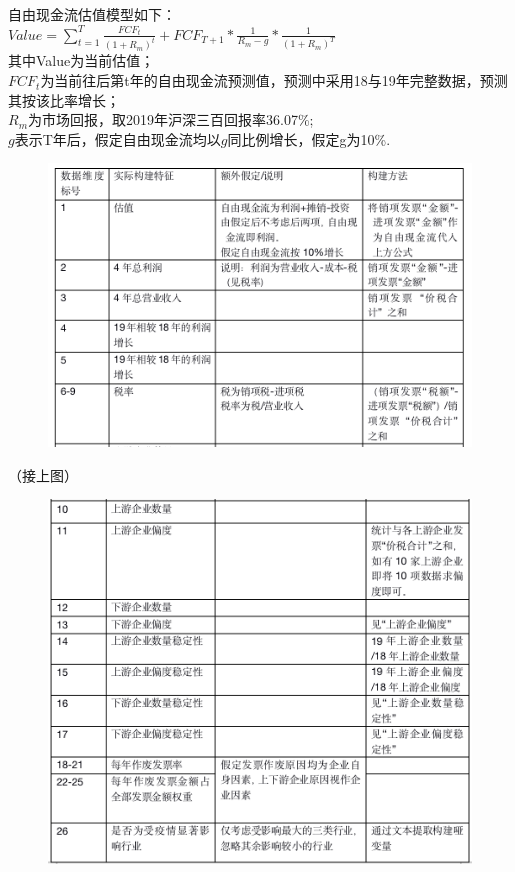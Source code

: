 \documentclass[bwprint]{cumcm}
\begin{document}
\noindent 自由现金流估值模型如下：\\
$Value = \sum_{t = 1}^{T} \frac{FCF_t}{(1+R_m)^t} +FCF_{T+1}*\frac{1}{R_m-g}*\frac{1}{(1+R_m)^T} $\\
其中Value为当前估值；\\
$FCF_t$为当前往后第t年的自由现金流预测值，预测中采用18与19年完整数据，预测其按该比率增长；\\
$R_m$为市场回报，取2019年沪深三百回报率36.07\%;\\
$g$表示T年后，假定自由现金流均以$g$同比例增长，假定g为10\%.
\begin{figure}[h]%
	\centering  %
	\includegraphics[width=1\linewidth]{figures/figure3.jpg}  %
	\label{fig:mcmthesis-logo}   %
\end{figure}
\newpage
（接上图）\\
\begin{figure}[h]%
	\centering  %
	\includegraphics[width=1\linewidth]{figures/figure4.jpg}  %
	\label{fig:mcmthesis-logo}   %
\end{figure}
\end{document}
